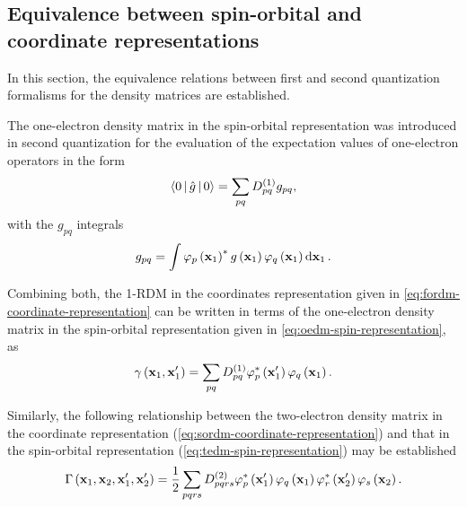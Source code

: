\subsection{Equivalence between spin-orbital and coordinate representations}
In this section, the equivalence relations between first and second quantization
formalisms for the density matrices are established.


The one-electron density matrix in the spin-orbital representation was
introduced in second quantization for the evaluation of the expectation values
of one-electron operators in the form 
\begin{equation}
    \Braket{0 | \hat{g} | 0} =
    \sum_{pq} \oedm_{pq} g_{pq}
    ,
\end{equation}
with the $g_{pq}$ integrals 
\begin{equation}
    g_{pq} = \int
    \varphi_p \left( \boldsymbol{\mathrm{x}}_1 \right)^{*} 
    g \left( \boldsymbol{\mathrm{x}}_1 \right) 
    \varphi_q \left( \boldsymbol{\mathrm{x}}_1 \right)
    \dd{ \boldsymbol{\mathrm{x}}_1}
    .
\end{equation}

Combining both, the 1-RDM in the coordinates representation given in 
\cref{eq:fordm-coordinate-representation} can be written
in terms of the one-electron density matrix in the spin-orbital representation
given in \cref{eq:oedm-spin-representation}, as
\begin{equation}
    \gamma \left( \boldsymbol{\mathrm{x}}_1, \boldsymbol{\mathrm{x}}_1^{\prime} \right) =
    \sum_{pq} D^{\left( 1 \right)}_{pq} 
    \varphi_p^{*} \left( \boldsymbol{\mathrm{x}}_1^{\prime} \right)
    \varphi_q \left( \boldsymbol{\mathrm{x}}_1 \right)
    .
\end{equation}

Similarly, the following relationship between the two-electron density matrix
in the coordinate representation (\cref{eq:sordm-coordinate-representation}) 
and that in the spin-orbital representation (\cref{eq:tedm-spin-representation})
may be established
\begin{equation}
    \Gamma \left( \boldsymbol{\mathrm{x}}_1, \boldsymbol{\mathrm{x}}_2, \boldsymbol{\mathrm{x}}_1^{\prime}, \boldsymbol{\mathrm{x}}_2^{\prime} \right)
    =
    \frac{1}{2} \sum_{pqrs} D^{\left( 2 \right)}_{pqrs}
    \varphi_p^{*}\left( \boldsymbol{\mathrm{x}}_1^{\prime} \right)
    \varphi_q    \left( \boldsymbol{\mathrm{x}}_1          \right)
    \varphi_r^{*}\left( \boldsymbol{\mathrm{x}}_2^{\prime} \right)
    \varphi_s    \left( \boldsymbol{\mathrm{x}}_2          \right)
    .
\end{equation}

